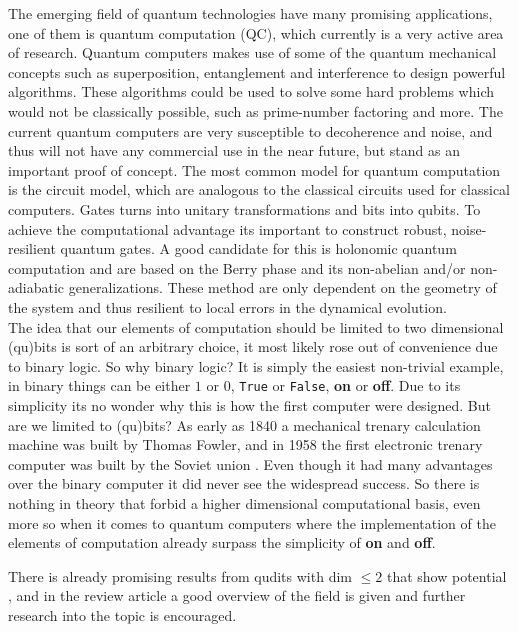 The emerging field of quantum technologies have many promising applications, one of them is quantum computation (QC), which currently is a very active area of research. Quantum computers makes use of some of the quantum mechanical concepts such as superposition, entanglement and interference to design powerful algorithms. These algorithms could be used to solve some hard problems which would not be classically possible, such as prime-number factoring\cite{shor} and more\cite{Grover}. The current quantum computers are very susceptible to decoherence and noise, and thus will not have any commercial use in the near future, but stand as an important proof of concept. 
The most common model for quantum computation is the circuit model, which are analogous to the classical circuits used for classical computers. Gates turns into unitary transformations and bits into qubits. To achieve the computational advantage its important to construct robust, noise-resilient quantum gates. A good candidate for this is holonomic quantum computation\cite{HQC}\cite{NHQC} and are based on the Berry phase\cite{berry} and its non-abelian and/or non-adiabatic generalizations\cite{anandan1}\cite{anandan2}\cite{zee}. These method are only dependent on the geometry of the system and thus resilient to local errors in the dynamical evolution.
\\
The idea that our elements of computation should be limited to two dimensional (qu)bits is sort of an arbitrary choice, it most likely rose out of convenience due to binary logic. So why binary logic? It is simply the easiest non-trivial example, in binary things can be either $1$ or $0$, {\tt True} or {\tt False}, \textbf{on} or \textbf{off}. Due to its simplicity its no wonder why this is how the first computer were designed. But are we limited to (qu)bits? As early as 1840 a mechanical trenary calculation machine was built by Thomas Fowler, and in 1958 the first electronic trenary computer was built by the Soviet union . Even though it had many advantages over the binary computer it did never see the widespread success. So there is nothing in theory that forbid a higher dimensional computational basis, even more so when it comes to quantum computers where the implementation of the elements of computation already surpass the simplicity of \textbf{on} and \textbf{off}. 

There is already promising results from qudits with dim $\leq 2$ that show potential \cite{qutrit1}\cite{qudit2}\cite{qudit3}, and in the review article \cite{qudit} a good overview of the field is given and further research into the topic is encouraged.

